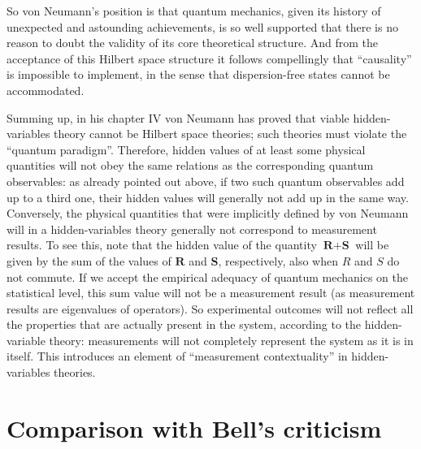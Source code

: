 \documentclass[11pt]{article}
\begin{document}
So von Neumann's position is that quantum mechanics, given its history of unexpected and astounding achievements, is so well supported that there is no reason to doubt the validity of its core theoretical structure. And from the acceptance of this Hilbert space structure it follows compellingly that ``causality'' is impossible to implement, in the sense that dispersion-free states cannot be accommodated.

Summing up, in his chapter IV von Neumann has proved that viable hidden-variables theory cannot be Hilbert space theories; such theories must violate the ``quantum paradigm''. Therefore, hidden values of at least some physical quantities will not obey the same relations as the corresponding quantum observables: as already pointed out above, if two such quantum observables add up to a third one, their hidden values will generally not add up in the same way.
Conversely, the physical quantities that were implicitly defined by von Neumann will in a hidden-variables theory generally not correspond to measurement results. To see this, note that the hidden value of the quantity $\textbf{R} + \textbf{S}$ will be given by the sum of the values of $\textbf{R}$ and $\textbf{S}$, respectively, also when $R$ and $S$ do not commute. If we accept the empirical adequacy of quantum mechanics on the statistical level, this sum value will not be a measurement result (as measurement results are eigenvalues of operators). So experimental outcomes will not reflect all the properties that are actually present in the system, according to the hidden-variable theory: measurements will not completely represent the system as it is in itself. This introduces an element of ``measurement contextuality'' in hidden-variables theories.



\section{Comparison with Bell's criticism}\label{Bell}
\end{document}
